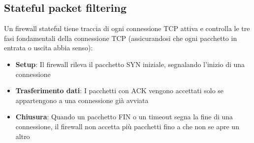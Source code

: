 \subsection{Stateful packet filtering}
Un firewall stateful tiene traccia di ogni connessione TCP attiva e controlla le tre fasi fondamentali della connessione TCP (assicurandosi che ogni pacchetto in entrata o uscita abbia senso):
\begin{itemize}
    \item \textbf{Setup}: Il firewall rileva il pacchetto SYN iniziale, segnalando l'inizio di una connessione
    \item \textbf{Trasferimento dati}: I pacchetti con ACK vengono accettati solo se appartengono a una connessione già avviata
    \item \textbf{Chiusura}: Quando un pacchetto FIN o un timeout segna la fine di una connessione, il firewall non accetta più pacchetti fino a che non se apre un altro
\end{itemize}


